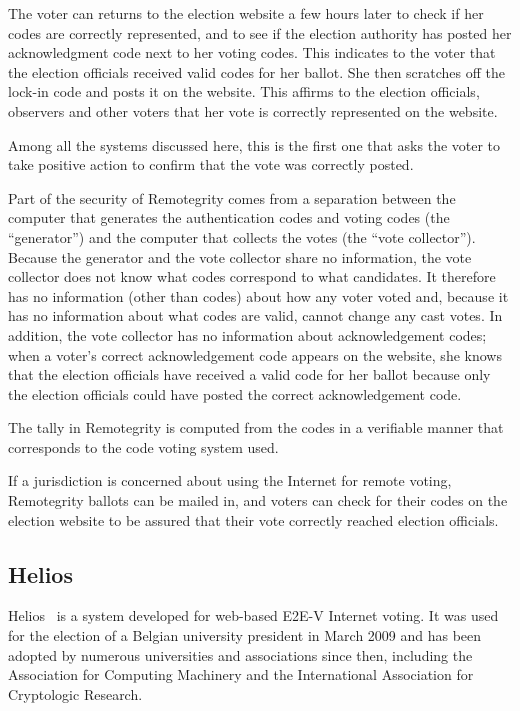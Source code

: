 The voter can returns to the election website a few hours later to
check if her codes are correctly represented, and to see if the
election authority has posted her acknowledgment code next to her
voting codes. This indicates to the voter that the election officials
received valid codes for her ballot. She then scratches off the
lock-in code and posts it on the website. This affirms to the election
officials, observers and other voters that her vote is correctly
represented on the website.

Among all the systems discussed here, this is the first one that asks
the voter to take positive action to confirm that the vote was
correctly posted.

Part of the security of Remotegrity comes from a separation between
the computer that generates the authentication codes and voting codes
(the ``generator'') and the computer that collects the votes (the
``vote collector''). Because the generator and the vote collector
share no information, the vote collector does not know what codes
correspond to what candidates. It therefore has no information (other
than codes) about how any voter voted and, because it has no
information about what codes are valid, cannot change any cast
votes. In addition, the vote collector has no information about
acknowledgement codes; when a voter's correct acknowledgement code
appears on the website, she knows that the election officials have
received a valid code for her ballot because only the election
officials could have posted the correct acknowledgement code.

The tally in Remotegrity is computed from the codes in a verifiable
manner that corresponds to the code voting system used.

If a jurisdiction is concerned about using the Internet for remote
voting, Remotegrity ballots can be mailed in, and voters can check for
their codes on the election website to be assured that their vote
correctly reached election officials.

\subsection{Helios}

Helios~\cite{adida2008,adida2009} is a system developed for web-based
E2E-V Internet voting. It was used for the election of a Belgian
university president in March 2009 and has been adopted by numerous
universities and associations since then, including the Association
for Computing Machinery and the International Association for
Cryptologic Research.

